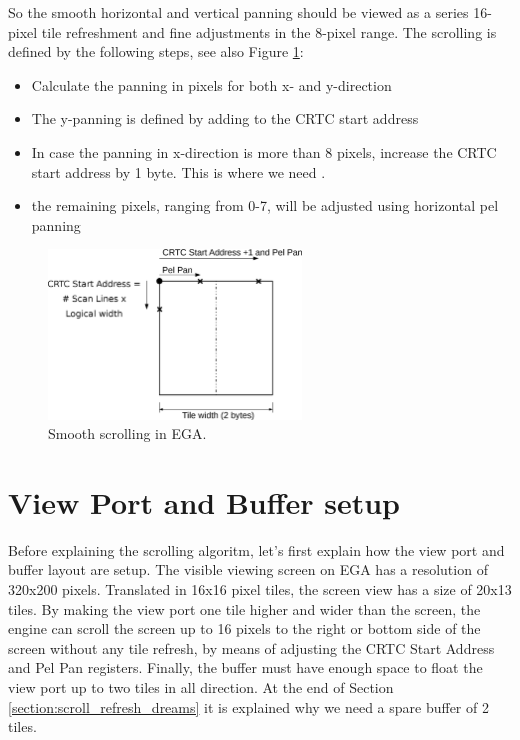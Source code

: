 \documentclass[book.tex]{subfiles}
\begin{document}
So the smooth horizontal and vertical panning should be viewed as a series 16-pixel tile refreshment and fine adjustments in the 8-pixel range. The scrolling is defined by the following steps, see also Figure \ref{fig:tile_refresh}:
\begin{itemize}
  \item Calculate the panning in pixels for both x- and y-direction
  \item The y-panning is defined by adding  to the CRTC start address
  \item In case the panning in x-direction is more than 8 pixels, increase the CRTC start address by 1 byte. This is where we need .
  \item the remaining pixels, ranging from 0-7, will be adjusted using horizontal pel panning
\end{itemize}


\begin{figure}[H]
\centering
\includegraphics[width=0.6\textwidth]{imgs/drawings/Tile_Refresh.eps}
\caption{Smooth scrolling in EGA.}
\label{fig:tile_refresh}
\end{figure}





\section{View Port and Buffer setup}
Before explaining the scrolling algoritm, let's first explain how the view port and buffer layout are setup. The visible viewing screen on EGA has a resolution of 320x200 pixels. Translated in 16x16 pixel tiles, the screen view has a size of 20x13 tiles. By making the view port one tile higher and wider than the screen, the engine can scroll the screen up to 16 pixels to the right or bottom side of the screen without any tile refresh, by means of adjusting the CRTC Start Address and Pel Pan registers. Finally, the buffer must have enough space to float the view port up to two tiles in all direction. At the end of Section \ref{section:scroll_refresh_dreams} it is explained why we need a spare buffer of 2 tiles.\\
\end{document}
